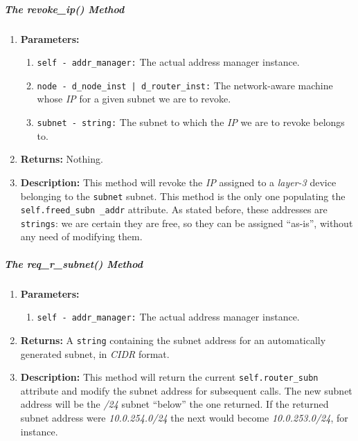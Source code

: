         \subparagraph{The revoke\_ip() Method}
            \begin{enumerate}
                \item \textbf{Parameters:}
                \begin{enumerate}
                    \item \texttt{self - addr\_manager:} The actual address manager instance.
                    \item \texttt{node - d\_node\_inst | d\_router\_inst:} The network-aware machine whose \textit{IP} for a given subnet we are to revoke.
                    \item \texttt{subnet - string:} The subnet to which the \textit{IP} we are to revoke belongs to.
                \end{enumerate}
                \item \textbf{Returns:} Nothing.
                \item \textbf{Description:} This method will revoke the \textit{IP} assigned to a \textit{layer-3} device belonging to the \texttt{subnet} subnet. This method is the only one populating the \texttt{self.freed\_subn \_addr} attribute. As stated before, these addresses are \texttt{strings}: we are certain they are free, so they can be assigned ``as-is'', without any need of modifying them.
            \end{enumerate}

        \subparagraph{The req\_r\_subnet() Method}
            \begin{enumerate}
                \item \textbf{Parameters:}
                \begin{enumerate}
                    \item \texttt{self - addr\_manager:} The actual address manager instance.
                \end{enumerate}
                \item \textbf{Returns:} A \texttt{string} containing the subnet address for an automatically generated subnet, in \textit{CIDR} format.
                \item \textbf{Description:} This method will return the current \texttt{self.router\_subn} attribute and modify the subnet address for subsequent calls. The new subnet address will be the \textit{/24} subnet ``below'' the one returned. If the returned subnet address were \textit{10.0.254.0/24} the next would become \textit{10.0.253.0/24}, for instance.
            \end{enumerate}


